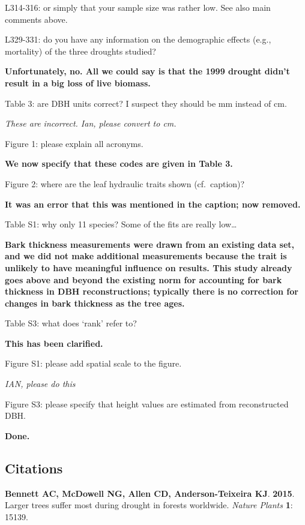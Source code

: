\documentclass[
]{article}
\begin{document}
L314-316: or simply that your sample size was rather low. See also main
comments above.

L329-331: do you have any information on the demographic effects (e.g.,
mortality) of the three droughts studied?

\textbf{Unfortunately, no. All we could say is that the 1999 drought
didn't result in a big loss of live biomass.}

Table 3: are DBH units correct? I suspect they should be mm instead of
cm.

\emph{These are incorrect. Ian, please convert to cm.}

Figure 1: please explain all acronyms.

\textbf{We now specify that these codes are given in Table 3.}

Figure 2: where are the leaf hydraulic traits shown (cf.~caption)?

\textbf{It was an error that this was mentioned in the caption; now
removed.}

Table S1: why only 11 species? Some of the fits are really low\ldots{}

\textbf{Bark thickness measurements were drawn from an existing data
set, and we did not make additional measurements because the trait is
unlikely to have meaningful influence on results. This study already
goes above and beyond the existing norm for accounting for bark
thickness in DBH reconstructions; typically there is no correction for
changes in bark thickness as the tree ages.}

Table S3: what does `rank' refer to?

\textbf{This has been clarified.}

Figure S1: please add spatial scale to the figure.

\emph{IAN, please do this}

Figure S3: please specify that height values are estimated from
reconstructed DBH.

\textbf{Done.}

\hypertarget{citations}{%
\subsection*{Citations}\label{citations}}

\hypertarget{refs}{}
\leavevmode\hypertarget{ref-bennett_larger_2015}{}%
\textbf{\textnormal{Bennett AC}, \textnormal{McDowell NG},
\textnormal{Allen CD}, \textnormal{Anderson-Teixeira KJ}}.
\textbf{2015}. Larger trees suffer most during drought in forests
worldwide. \emph{Nature Plants} \textbf{1}: 15139.
\end{document}
